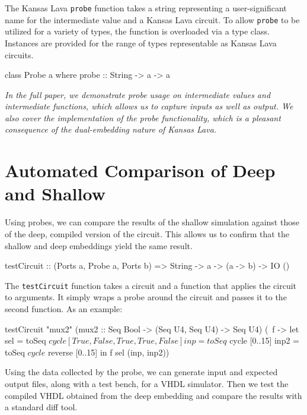 \documentclass{llncs}
\begin{document}
The Kansas Lava \verb!probe! function takes a string representing a
user-significant name for the intermediate value and a Kansas Lava
circuit. To allow \verb!probe! to be utilized for a variety of types, the
function is overloaded via a type class. Instances are provided for the range of
types representable as Kansas Lava circuits.

\begin{code}
class Probe a where
  probe :: String -> a -> a
\end{code}

\emph{In the full paper, we demonstrate probe usage on intermediate values
and intermediate functions, which allows us to capture inputs as well as output.
We also cover the implementation of the probe functionality, which is a
pleasant consequence of the dual-embedding nature of Kansas Lava.}

\section{Automated Comparison of Deep and Shallow}
\label{sec:comparing}

Using probes, we can compare the results of the shallow simulation
against those of the deep, compiled version of the circuit. This allows us to
confirm that the shallow and deep embeddings yield the same result.

\begin{code}
testCircuit :: (Ports a, Probe a, Ports b) =>
                String -> a -> (a -> b) -> IO ()
\end{code}

The \verb!testCircuit! function takes a circuit and
a function that applies the circuit to arguments. It simply wraps a probe around
the circuit and passes it to the second function. As an example:

\begin{code}
testCircuit "mux2" 
    (mux2 :: Seq Bool -> (Seq U4, Seq U4) -> Seq U4)
    (\ f -> let sel  = toSeq $ cycle [True,False,True,True,False]
                inp  = toSeq $ cycle [0..15]
                inp2 = toSeq $ cycle $ reverse [0..15]
            in f sel (inp, inp2))  
\end{code}

Using the data collected by the probe, we can generate input and expected output
files, along with a test bench, for a VHDL simulator. Then we test the
compiled VHDL obtained from the deep embedding and compare the results with 
a standard diff tool.
\end{document}
